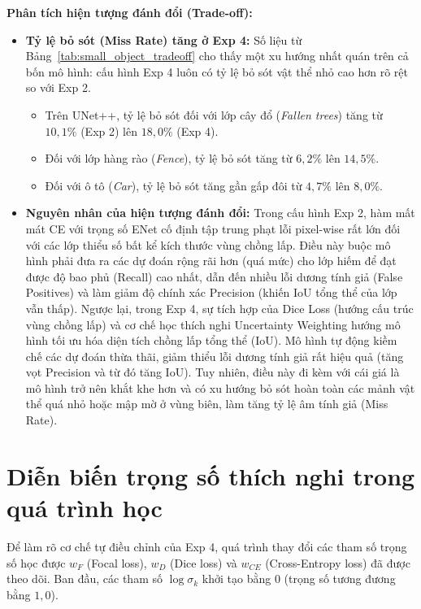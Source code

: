 \noindent\textbf{Phân tích hiện tượng đánh đổi (Trade-off):}
\begin{itemize}[leftmargin=1.4cm]
  \item \textbf{Tỷ lệ bỏ sót (Miss Rate) tăng ở Exp 4:} Số liệu từ Bảng~\ref{tab:small_object_tradeoff} cho thấy một xu hướng nhất quán trên cả bốn mô hình: cấu hình Exp 4 luôn có tỷ lệ bỏ sót vật thể nhỏ cao hơn rõ rệt so với Exp 2.
        \begin{itemize}
          \item Trên UNet++, tỷ lệ bỏ sót đối với lớp cây đổ (\textit{Fallen trees}) tăng từ $10,1\%$ (Exp 2) lên $18,0\%$ (Exp 4).
          \item Đối với lớp hàng rào (\textit{Fence}), tỷ lệ bỏ sót tăng từ $6,2\%$ lên $14,5\%$.
          \item Đối với ô tô (\textit{Car}), tỷ lệ bỏ sót tăng gần gấp đôi từ $4,7\%$ lên $8,0\%$.
        \end{itemize}
  \item \textbf{Nguyên nhân của hiện tượng đánh đổi:} Trong cấu hình Exp 2, hàm mất mát CE với trọng số ENet cố định tập trung phạt lỗi pixel-wise rất lớn đối với các lớp thiểu số bất kể kích thước vùng chồng lấp. Điều này buộc mô hình phải đưa ra các dự đoán rộng rãi hơn (quá mức) cho lớp hiếm để đạt được độ bao phủ (Recall) cao nhất, dẫn đến nhiều lỗi dương tính giả (False Positives) và làm giảm độ chính xác Precision (khiến IoU tổng thể của lớp vẫn thấp). 
        Ngược lại, trong Exp 4, sự tích hợp của Dice Loss (hướng cấu trúc vùng chồng lấp) và cơ chế học thích nghi Uncertainty Weighting hướng mô hình tối ưu hóa diện tích chồng lấp tổng thể (IoU). Mô hình tự động kiềm chế các dự đoán thừa thãi, giảm thiểu lỗi dương tính giả rất hiệu quả (tăng vọt Precision và từ đó tăng IoU). Tuy nhiên, điều này đi kèm với cái giá là mô hình trở nên khắt khe hơn và có xu hướng bỏ sót hoàn toàn các mảnh vật thể quá nhỏ hoặc mập mờ ở vùng biên, làm tăng tỷ lệ âm tính giả (Miss Rate).
\end{itemize}

\section{Diễn biến trọng số thích nghi trong quá trình học}
\label{sec:loss_weights_evolution}

Để làm rõ cơ chế tự điều chỉnh của Exp 4, quá trình thay đổi các tham số trọng số học được $w_F$ (Focal loss), $w_D$ (Dice loss) và $w_{CE}$ (Cross-Entropy loss) đã được theo dõi. Ban đầu, các tham số $\log\sigma_k$ khởi tạo bằng $0$ (trọng số tương đương bằng $1{,}0$).

